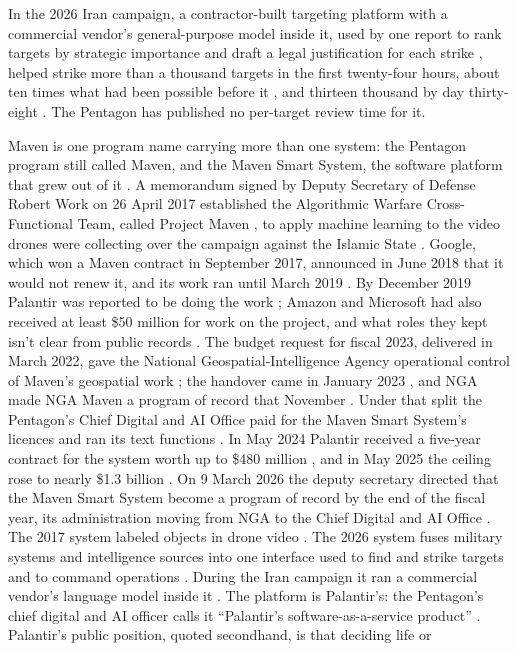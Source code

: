 
In the 2026 Iran campaign, a contractor-built targeting platform with a commercial vendor's general-purpose model inside it, used by one report to rank targets by strategic importance and draft a legal justification for each strike \autocite{livingstone2026maven}, helped strike more than a thousand targets in the first twenty-four hours, about ten times what had been possible before it \autocite{csis2026maven}, and thirteen thousand by day thirty-eight \autocite{breakingdefense2026maven}. The Pentagon has published no per-target review time for it.


Maven is one program name carrying more than one system: the Pentagon program still called Maven, and the Maven Smart System, the software platform that grew out of it \autocite{csis2026maven}. A memorandum signed by Deputy Secretary of Defense Robert Work on 26 April 2017 established the Algorithmic Warfare Cross-Functional Team, called Project Maven \autocite{work2017maven,allen2017maven}, to apply machine learning to the video drones were collecting over the campaign against the Islamic State \autocite{weisgerber2017maven}. Google, which won a Maven contract in September 2017, announced in June 2018 that it would not renew it, and its work ran until March 2019 \autocite{fang2018maven,conger2018maven}. By December 2019 Palantir was reported to be doing the work \autocite{peterson2019palantir}; Amazon and Microsoft had also received at least \$50 million for work on the project, and what roles they kept isn't clear from public records \autocite{poulson2023maven}. The budget request for fiscal 2023, delivered in March 2022, gave the National Geospatial-Intelligence Agency operational control of Maven's geospatial work \autocite{breakingdefense2022nga}; the handover came in January 2023 \autocite{albon2023nga}, and NGA made NGA Maven a program of record that November \autocite{nga2023programrecord}. Under that split the Pentagon's Chief Digital and AI Office paid for the Maven Smart System's licences and ran its text functions \autocite{csis2026maven}. In May 2024 Palantir received a five-year contract for the system worth up to \$480 million \autocite{register2024maven,defensescoop2025maven}, and in May 2025 the ceiling rose to nearly \$1.3 billion \autocite{defensescoop2025maven}. On 9 March 2026 the deputy secretary directed that the Maven Smart System become a program of record by the end of the fiscal year, its administration moving from NGA to the Chief Digital and AI Office \autocite{defensescoop2026maven}. The 2017 system labeled objects in drone video \autocite{fang2019maven}. The 2026 system fuses military systems and intelligence sources into one interface used to find and strike targets and to command operations \autocite{defensescoop2026transition}. During the Iran campaign it ran a commercial vendor's language model inside it \autocite{livingstone2026maven}. The platform is Palantir's: the Pentagon's chief digital and AI officer calls it “Palantir's software-as-a-service product” \autocite{defensescoop2026transition}. Palantir's public position, quoted secondhand, is that deciding life or 